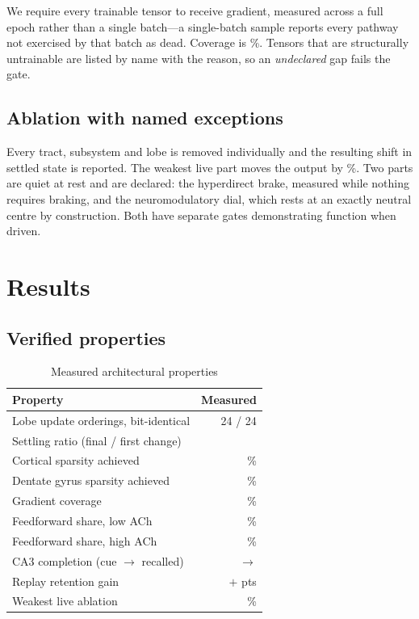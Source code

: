 \documentclass[conference]{IEEEtran}
\begin{document}
We require every trainable tensor to receive gradient, measured across a full
epoch rather than a single batch---a single-batch sample reports every pathway
not exercised by that batch as dead. Coverage is
\GatesGradientCoverage{}\%. Tensors that are structurally untrainable are listed
by name with the reason, so an \emph{undeclared} gap fails the gate.

\subsection{Ablation with named exceptions}

Every tract, subsystem and lobe is removed individually and the resulting shift
in settled state is reported. The weakest live part moves the output by
\GatesWeakestAblation{}\%. Two parts are quiet at rest and are declared: the
hyperdirect brake, measured while nothing requires braking, and the
neuromodulatory dial, which rests at an exactly neutral centre by construction.
Both have separate gates demonstrating function when driven.

\section{Results}

\subsection{Verified properties}

\begin{table}[t]
\caption{Measured architectural properties}
\label{tab:properties}
\centering
\begin{tabular}{lr}
\toprule
Property & Measured \\
\midrule
Lobe update orderings, bit-identical & 24 / 24 \\
Settling ratio (final / first change) & \GatesSettlingRatio{} \\
Cortical sparsity achieved & \GatesSparsityAchieved{}\% \\
Dentate gyrus sparsity achieved & \GatesDgSparsity{}\% \\
Gradient coverage & \GatesGradientCoverage{}\% \\
Feedforward share, low ACh & \GatesAchLow{}\% \\
Feedforward share, high ACh & \GatesAchHigh{}\% \\
CA3 completion (cue $\rightarrow$ recalled) & \GatesCaThreeBefore{} $\rightarrow$ \GatesCaThreeAfter{} \\
Replay retention gain & $+$\GatesReplayGain{} pts \\
Weakest live ablation & \GatesWeakestAblation{}\% \\
\bottomrule
\end{tabular}
\end{table}
\end{document}
